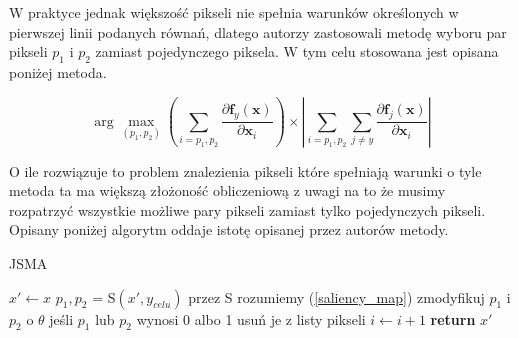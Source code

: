 \documentclass[
    left=2.5cm,         %
    right=2.5cm,        %
    top=2.5cm,          %
    bottom=3cm,         %
    bindingoffset=6mm,  %
    nohyphenation=false %
]{eiti/eiti-thesis}
\begin{document}

W praktyce jednak większość pikseli nie spełnia warunków określonych w pierwszej linii podanych równań,
dlatego autorzy zastosowali metodę wyboru par pikseli $p_1$ i $p_2$ zamiast pojedynczego piksela.
W tym celu stosowana jest opisana poniżej metoda.

\begin{equation} \label{saliency_map}
\arg \max _ { \left( p _ { 1 } , p _ { 2 } \right) } \left( \sum _ { i = p _ { 1 } , p _ { 2 } } \frac { \partial \mathbf { f } _ { y } ( \mathbf { x } ) } { \partial \mathbf { x } _ { i } } \right) \times \left| \sum _ { i = p _ { 1 } , p _ { 2 } } \sum _ { j \neq y } \frac { \partial \mathbf { f } _ { j } ( \mathbf { x } ) } { \partial \mathbf { x } _ { i } } \right|
\end{equation}

O ile rozwiązuje to problem znalezienia pikseli które spełniają warunki o tyle metoda ta ma większą złożoność obliczeniową
z uwagi na to że musimy rozpatrzyć wszystkie możliwe pary pikseli zamiast tylko pojedynczych pikseli.
Opisany poniżej algorytm oddaje istotę opisanej przez autorów metody.

\begin{algorithm}
\caption{JSMA}\label{JSMA}
\begin{algorithmic}[1]
\State $x' \gets x$
    \State $p_1, p_2$ = S$(x',y_{celu})$ \Comment przez S rozumiemy (\ref{saliency_map})
    \State zmodyfikuj $p_1$ i $p_2$ o $\theta$
    \State jeśli $p_1$ lub $p_2$ wynosi 0 albo 1 usuń je z listy pikseli
    \State $i \gets i+1$
\EndWhile
\State \textbf{return} $x'$
\end{algorithmic}
\end{algorithm}
\end{document}
